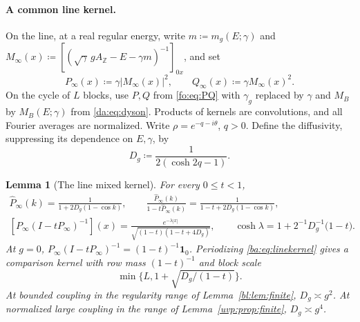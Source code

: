 \documentclass[11pt]{article}
\numberwithin{equation}{section}
\newtheorem{lemma}[theorem]{Lemma}
\theoremstyle{remark}
\begin{document}
\paragraph{A common line kernel.}
On the line, at a real regular energy, write $m\coloneqq m_g(E;\gamma)$ and
$M_\infty(x)\coloneqq[(\sqrt\gamma\,gA_{\mathbb Z}-E-\gamma m)^{-1}]_{0x}$, and set
\[
 P_\infty(x)\coloneqq \gamma|M_\infty(x)|^2,\qquad
 Q_\infty(x)\coloneqq \gamma M_\infty(x)^2.
\]
On the cycle of $L$ blocks, use $P,Q$ from \eqref{fo:eq:PQ} with
$\gamma_g$ replaced by $\gamma$ and $M_B$ by $M_B(E;\gamma)$ from
\eqref{da:eq:dyson}. Products of kernels are convolutions, and all
Fourier averages are normalized. Write $\rho=e^{-q-i\theta}$,
$q>0$. Define the diffusivity, suppressing its dependence on $E,\gamma$, by
\begin{equation}\label{ba:eq:diffusivity}
 D_g\coloneqq \frac1{2(\cosh2q-1)}.
\end{equation}
\begin{lemma}[The line mixed kernel]\label{da:lem:line-kernel}
For every $0\le t<1$,
\begin{equation}\label{ba:eq:linekernel}
 \begin{gathered}
 \widehat P_\infty(k)=\frac1{1+2D_g(1-\cos k)},\qquad
 \frac{\widehat P_\infty(k)}{1-t\widehat P_\infty(k)}
 =\frac1{1-t+2D_g(1-\cos k)},\\
 [P_\infty(I-tP_\infty)^{-1}](x)=\frac{e^{-\lambda|x|}}{\sqrt{(1-t)(1-t+4D_g)}},\qquad
 \cosh\lambda=1+2^{-1}D_g^{-1}\bigl(1-t\bigr).
 \end{gathered}
\end{equation}
At $g=0$, $P_\infty(I-tP_\infty)^{-1}=(1-t)^{-1}\mathbf1_0$.
Periodizing \eqref{ba:eq:linekernel} gives a comparison kernel with
row mass $(1-t)^{-1}$ and block scale
\[
 \min\{L,1+\sqrt{D_g/(1-t)}\}.
\]
At bounded coupling in the regularity range of
Lemma~\ref{bl:lem:finite}, $D_g\asymp g^2$. At normalized large
coupling in the range of Lemma~\ref{uvp:prop:finite},
$D_g\asymp g^4$.
\end{lemma}
\end{document}
